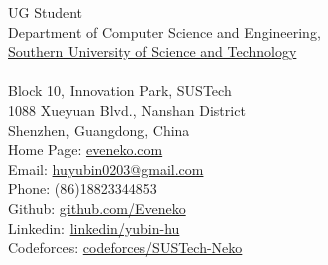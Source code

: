 \documentclass[10pt,a4paper]{article}
\begin{document}
\sloppy  %


\nobreakvspace{0.3em}  %


\begin{multicols}{2}
\noindent UG Student
\\
Department of Computer Science and Engineering,
\\
\href{https://www.sustech.edu.cn/}{Southern University of Science and Technology}
\\
\\
Block 10, Innovation Park, SUSTech
\\
1088 Xueyuan Blvd., Nanshan District
\\
Shenzhen, Guangdong, China
\\
Home Page: \href{https://eveneko.com}{eveneko.com}
\\
Email: \noindent\href{mailto:huyubin0203@gmail.com}{huyubin0203\mbox{}@\mbox{}gmail.com}
\\
Phone: \textsmaller{+}(86)18823344853
\\
Github: \href{https://github.com/Eveneko}{github.com/Eveneko}
\\
Linkedin: \href{https://www.linkedin.com/in/yubin-hu-7855861a0/}{linkedin/yubin-hu}
\\
Codeforces: \href{http://codeforces.com/profile/SUSTech-Neko}{codeforces/SUSTech-Neko}
\end{multicols}



\end{document}
